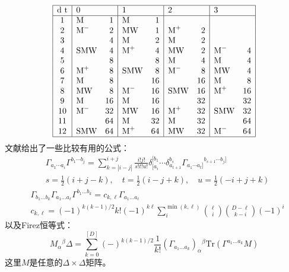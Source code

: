 \begin{equation*}
	\begin{array}{|c|lr|lr|lr|lr|}\hline\text{d  t}&0&&1&&2&&3&\\\hline1&\text{M}&1&\text{M}&1&&&&\\2&\text{M}^-&2&\text{MW}&1&\text{M}^+&2&&\\3&&4&\text{M}&2&\text{M}&2&&\\4&\text{SMW}&4&\text{M}^+&4&\text{MW}&2&\text{M}^-&4\\5&&8&&8&\text{M}&4&\text{M}&4\\6&\text{M}^+&8&\text{SMW}&8&\text{M}^-&8&\text{MW}&4\\7&\text{M}&8&&16&&16&\text{M}&8\\8&\text{MW}&8&\text{M}^-&16&\text{SMW}&16&\text{M}^+&16\\9&\text{M}&16&\text{M}&16&&32&&32\\10&\text{M}^-&32&\text{MW}&16&\text{M}^+&32&\text{SMW}&32\\11&&64&\text{M}&32&\text{M}&32&&64\\12&\text{SMW}&64&\text{M}^+&64&\text{MW}&32&\text{M}^-&64\\\hline\end{array}
\end{equation*}
文献\cite{Kennedy:1981kp,vanHolten:1982mx}给出了一些比较有用的公式：
\begin{equation}
	\begin{aligned}&\Gamma_{a_1\cdots a_i}\Gamma^{b_1\cdots b_j}=\sum_{k=\left|i-j\right|}^{i+j}\frac{i!j!}{s!t!u!}\delta_{[a_i}^{[b_1} {\cdots} \delta^{b_s}_{a_{t+1}}{\Gamma_{a_1\cdots a_t]}}^{b_{s+1}\cdots b_{j}]}\\&s=\frac{1}{2}(i+j-k),\quad t=\frac{1}{2}(i-j+k),\quad u=\frac{1}{2}(-i+j+k)\end{aligned}
\end{equation}
\begin{equation}
	\begin{aligned}
		&\Gamma_{b_{1}\ldots b_{k}}\Gamma_{a_{1}\ldots a_{\ell}}\Gamma^{b_{1}\ldots b_{k}}=c_{k,\ell}\Gamma_{a_{1}\ldots a_{\ell}} \\
		&c_{k,\ell}=(-1)^{k(k-1)/2}k!(-1)^{k\ell}\sum_i^{\min(k,\ell)}\binom{\ell}{i}\binom{D-\ell}{k-i}(-1)^i
	\end{aligned}
\end{equation}
以及Firez恒等式：
\begin{equation}
	M_{\alpha}{}^{\beta}\Delta=\sum_{k=0}^{[D]}(-)^{k(k-1)/2}\frac{1}{k!}\left(\Gamma_{a_1...a_k}\right)_{\alpha}{}^{\beta}\text{Tr}(\Gamma^{a_1...a_k}M)
\end{equation}
这里$M$是任意的$\Delta\times\Delta$矩阵。
